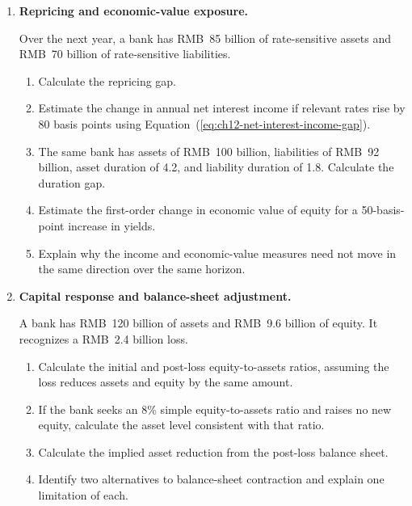 \begin{enumerate}
\begin{enumerate}
\item Calculate liquidity capacity under Equation~(\ref{eq:ch12-liquidity-capacity}).
\item Is the stated capacity sufficient to meet the outflow?
\item If the bank uses all reserves and RMB~7 billion of cash from securities sales, what liquid resources remain under the stated assumptions?
\item Explain how the answer would change if part of the securities portfolio were already pledged as collateral.
\end{enumerate}


\item \textbf{Repricing and economic-value exposure.}


Over the next year, a bank has RMB~85 billion of rate-sensitive assets and RMB~70 billion of rate-sensitive liabilities.

\begin{enumerate}
\item Calculate the repricing gap.
\item Estimate the change in annual net interest income if relevant rates rise by 80 basis points using Equation~(\ref{eq:ch12-net-interest-income-gap}).
\item The same bank has assets of RMB~100 billion, liabilities of RMB~92 billion, asset duration of 4.2, and liability duration of 1.8. Calculate the duration gap.
\item Estimate the first-order change in economic value of equity for a 50-basis-point increase in yields.
\item Explain why the income and economic-value measures need not move in the same direction over the same horizon.
\end{enumerate}

\item \textbf{Capital response and balance-sheet adjustment.}

A bank has RMB~120 billion of assets and RMB~9.6 billion of equity. It recognizes a RMB~2.4 billion loss.

\begin{enumerate}
\item Calculate the initial and post-loss equity-to-assets ratios, assuming the loss reduces assets and equity by the same amount.
\item If the bank seeks an 8\% simple equity-to-assets ratio and raises no new equity, calculate the asset level consistent with that ratio.
\item Calculate the implied asset reduction from the post-loss balance sheet.
\item Identify two alternatives to balance-sheet contraction and explain one limitation of each.
\end{enumerate}

\end{enumerate}

